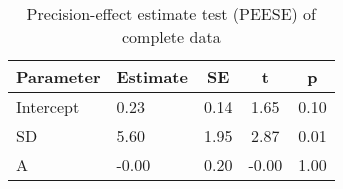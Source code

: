 \begin{table}[ht]
\centering
\caption{Precision-effect estimate test (PEESE) of complete data} 
\label{tab:PEESE}
\begingroup\small
\begin{tabular}{llccc}
  \hline
Parameter & Estimate & SE & t & p \\ 
  \hline
Intercept & 0.23 & 0.14 & 1.65 & 0.10 \\ 
  SD & 5.60 & 1.95 & 2.87 & 0.01 \\ 
  A & -0.00 & 0.20 & -0.00 & 1.00 \\ 
  \end{tabular}
\endgroup
\end{table}

